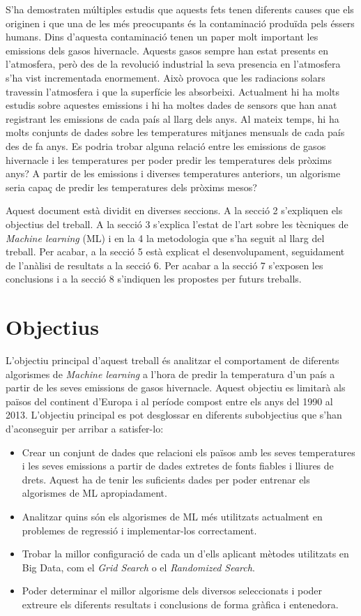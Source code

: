 \documentclass[10pt,a4paper,twocolumn,twoside]{article}
\begin{document}
S'ha demostraten múltiples estudis que aquests fets tenen diferents causes que els originen i que una de les més preocupants és la contaminació produïda pels éssers humans. Dins d'aquesta contaminació tenen un paper molt important les emissions dels gasos hivernacle. Aquests gasos sempre han estat presents en l'atmosfera, però des de la revolució industrial la seva presencia en l'atmosfera s'ha vist incrementada enormement. Això provoca que les radiacions solars travessin l'atmosfera i que la superfície les absorbeixi. Actualment hi ha molts estudis sobre aquestes emissions i hi ha moltes dades de sensors que han anat registrant les emissions de cada país al llarg dels anys. Al mateix temps, hi ha molts conjunts de dades sobre les temperatures mitjanes mensuals de cada país des de fa anys. Es podria trobar alguna relació entre les emissions de gasos hivernacle i les temperatures per poder predir les temperatures dels pròxims anys? A partir de les emissions i diverses temperatures anteriors, un algorisme seria capaç de predir les temperatures dels pròxims mesos?

Aquest document està dividit en diverses seccions. A la secció 2 s'expliquen els objectius del treball. A la  secció 3 s'explica l'estat de l'art sobre les tècniques de \textit{Machine learning} (ML) i en la 4 la metodologia que s'ha seguit al llarg del treball. Per acabar, a la secció 5 està explicat el desenvolupament, seguidament de l'anàlisi de resultats a la secció 6. Per acabar a la secció 7 s'exposen les conclusions i a la secció 8 s'indiquen les propostes per futurs treballs.   
\section{Objectius}
L'objectiu principal d'aquest treball és analitzar el comportament de diferents algorismes de \textit{Machine learning} a l'hora de predir la temperatura d'un país a partir de les seves emissions de gasos hivernacle. Aquest objectiu es limitarà als països del continent d'Europa i al període compost entre els anys del 1990 al 2013. L'objectiu principal es pot desglossar en diferents subobjectius que s'han d'aconseguir per arribar a satisfer-lo:
\begin{itemize}
\item Crear un conjunt de dades que relacioni els països amb les seves temperatures i les seves emissions a partir de dades extretes de fonts fiables i lliures de drets. Aquest ha de tenir les suficients dades per poder entrenar els algorismes de ML apropiadament.
\item Analitzar quins són els algorismes de ML més utilitzats actualment en problemes de regressió i implementar-los correctament.
\item Trobar la millor configuració de cada un d'ells aplicant mètodes utilitzats en Big Data, com el \textit{Grid Search} o el \textit{Randomized Search}.
\item Poder determinar el millor algorisme dels diversos seleccionats i poder extreure els diferents resultats i conclusions de forma gràfica i entenedora.  
\end{itemize}
\end{document}
